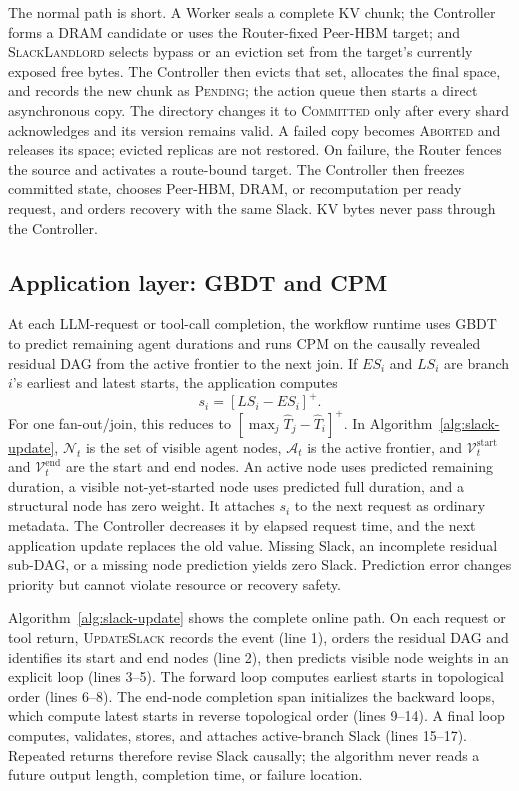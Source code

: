 The normal path is short.  A Worker seals a complete KV chunk; the Controller
forms a DRAM candidate or uses the Router-fixed Peer-HBM target; and
\textsc{SlackLandlord} selects bypass or an eviction set from the target's
currently exposed free bytes.  The Controller then evicts that set, allocates
the final space, and records the new chunk as \textsc{Pending}; the action queue
then starts a direct asynchronous copy.  The directory changes it to
\textsc{Committed} only after every shard acknowledges and its version remains
valid.  A failed copy becomes \textsc{Aborted} and releases its space; evicted
replicas are not restored.  On
failure, the Router fences the source and activates a
route-bound target.  The Controller then freezes committed state, chooses
Peer-HBM, DRAM, or recomputation per ready request, and orders recovery with
the same Slack.  KV bytes never pass through the Controller.

\subsection{Application layer: GBDT and CPM}
\label{sec:application-layer}

At each LLM-request or tool-call completion, the workflow runtime uses GBDT to
predict remaining agent durations and runs CPM on the causally revealed
residual DAG from the active frontier to the next join.  If $ES_i$ and $LS_i$
are branch $i$'s earliest and latest starts, the application computes
\begin{equation}
  s_i=[LS_i-ES_i]^+.
  \label{eq:design-slack}
\end{equation}
For one fan-out/join, this reduces to
$[\max_j\widehat T_j-\widehat T_i]^+$.
In Algorithm~\ref{alg:slack-update}, $\mathcal N_t$ is the set of visible
agent nodes, $\mathcal A_t$ is the active frontier, and
$\mathcal V_t^{\mathrm{start}}$ and $\mathcal V_t^{\mathrm{end}}$ are the
start and end nodes.  An active node uses predicted remaining duration, a visible
not-yet-started node uses predicted full duration, and a structural node has
zero weight.
It attaches $s_i$ to the next request as ordinary metadata.  The Controller
decreases it by elapsed request time, and the next application update replaces
the old value.  Missing Slack, an incomplete residual sub-DAG, or a missing
node prediction yields zero Slack.  Prediction error changes priority but
cannot violate resource or recovery safety.

Algorithm~\ref{alg:slack-update} shows the complete online path.  On each
request or tool return, \textsc{UpdateSlack} records the event (line 1), orders
the residual DAG and identifies its start and end nodes (line 2), then predicts
visible node weights in an explicit loop (lines 3--5).  The forward loop
computes earliest starts in topological order (lines 6--8).  The end-node
completion span initializes the backward loops, which compute latest starts in
reverse topological order (lines 9--14).  A final loop computes, validates,
stores, and attaches active-branch Slack (lines 15--17).  Repeated returns
therefore revise Slack causally; the algorithm never reads a future output
length, completion time, or failure location.

